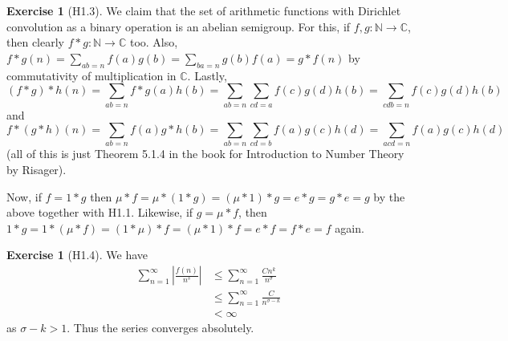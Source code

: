 \documentclass[reqno]{amsart}
\theoremstyle{definition}
\newtheorem{exercise}[theorem]{Exercise}
\theoremstyle{remark}
\begin{document}
    \begin{exercise}[H1.3]
        We claim that the set of arithmetic functions
        with Dirichlet convolution as a binary operation is
        an abelian semigroup.
        For this, if $f,g \colon \mathbb{N}  \to \mathbb{C}$, then
        clearly $f * g \colon \mathbb{N} \to \mathbb{C}$ too.
        Also,
        $f *g(n) = \sum_{ab = n} f(a) g(b) = 
        \sum_{ba = n} g(b) f(a) = g*f(n)$ by commutativity
        of multiplication in $\mathbb{C}$.
        Lastly,
        \[
            \left( f*g \right) *h(n)
            = \sum_{ab = n} f*g(a) h(b)
            = \sum_{ab=n} \sum_{cd = a} f(c) g(d) h(b)
            = \sum_{cdb = n} f(c) g(d) h(b)
        \] 
        and
        \[
        f * \left( g*h \right) (n)
        = \sum_{ab = n} f(a) g*h(b)
        = \sum_{ab = n} \sum_{cd = b} f(a) g(c) h(d)
        = \sum_{acd = n} f(a) g(c) h(d)
        \] 
        (all of this is just Theorem 5.1.4 in the book for Introduction to Number Theory
        by Risager).

        Now, if
        $f = 1 * g$ then
        $\mu * f = \mu * \left( 1 * g \right) 
        = \left( \mu * 1 \right) * g
        = e * g
        = g * e = g$ by the above together with
        H1.1.
        Likewise, if $g = \mu * f$, then
        $1 * g = 1 * \left( \mu * f \right) 
        = \left( 1 * \mu \right) * f
        = \left( \mu * 1 \right) * f
        = e * f = f * e = f$ again.
    \end{exercise}

    \begin{exercise}[H1.4]
        We have
        \begin{align*}
            \sum_{n=1}^{\infty} \left| 
            \frac{f(n)}{n^{s}}\right| 
            &\le 
            \sum_{n=1}^{\infty } \frac{C n^{k}}{n^{\sigma}}\\
            &\le \sum_{n=1}^{\infty}
            \frac{C}{n^{\sigma - k}}\\
            &< \infty
        \end{align*}
        as $\sigma - k > 1$. Thus the series
        converges absolutely.
    \end{exercise}
\end{document}
